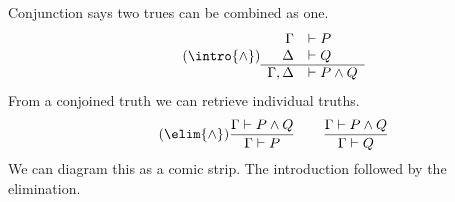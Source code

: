 Conjunction says two trues can be combined as one.
\begin{align*}
    \tag{$\intro{\wedge}$}
    \begin{array}{rl}
        \Gamma & \vdash P\\
        \Delta & \vdash Q\\
    \hline 
        \Gamma,\Delta & \vdash P\wedge Q
    \end{array}
\end{align*}
From a conjoined truth we can retrieve individual truths.
\begin{align*}
    \tag{$\elim{\wedge}$}
    \frac{\Gamma\vdash P\wedge Q}{\Gamma\vdash P}
    \qquad 
    \frac{\Gamma\vdash P\wedge Q}{\Gamma\vdash Q}
\end{align*}
We can diagram this as a comic strip.  The introduction followed by the 
elimination.
